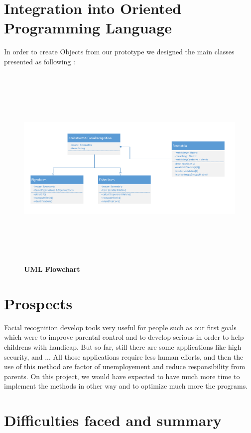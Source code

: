\section{Integration into Oriented Programming Language}
In order to create Objects from our prototype we designed the main classes presented as following :

\begin{figure}[bth]%
\begin{center}
\includegraphics[scale=0.85,height=10cm,width=14cm]{diag_uml}%
\caption{\textbf{UML Flowchart }}%
\end {center}
\end{figure}


\section{Prospects}
Facial recognition develop tools very useful for people such as our first goals which were to improve parental control and to develop serious in order to help childrens with handicap. But so far, still there are some applications like high security, and ... All those applications require less human efforts, and then the use of this method are factor of unemployement and reduce responsibility from parents.
On this project, we would have expected to have much more time to implement the methods in other way and to optimize much more the programs.

\clearpage
\section{Difficulties faced and summary}
